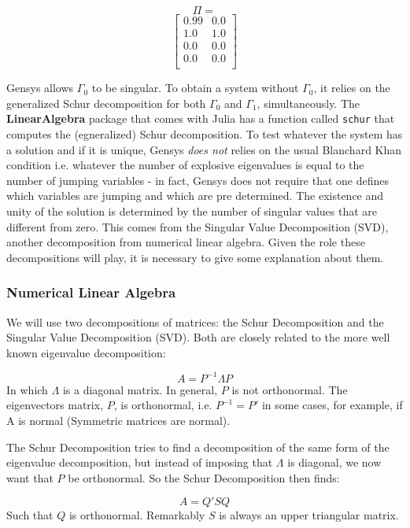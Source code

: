 \documentclass[12pt,a4paper]{article}
\begin{document}
$$\Pi = $$\begin{equation}
\left[
\begin{array}{cc}
0.99 & 0.0 \\
1.0 & 1.0 \\
0.0 & 0.0 \\
0.0 & 0.0 \\
\end{array}
\right]
\end{equation}


Gensys allows $\Gamma_0$ to be singular. To obtain a system without $\Gamma_0$, it relies on the generalized Schur decomposition for both $\Gamma_0$ and $\Gamma_1$, simultaneously. The \textbf{LinearAlgebra} package that comes with Julia has a function called \texttt{schur} that computes the (egneralized) Schur decomposition. To test whatever the system has a solution and if it is unique, Gensys \emph{does not} relies on the usual Blanchard Khan condition i.e. whatever the number of explosive eigenvalues is equal to the number of jumping variables - in fact, Gensys does not require that one defines which variables are jumping and which are pre determined. The existence and unity of the solution is determined by the number of singular values that are different from zero. This comes from the Singular Value Decomposition (SVD), another decomposition from numerical linear algebra. Given the role these decompositions will play, it is necessary to give some explanation about them.

\subsubsection{Numerical Linear Algebra}
We will use two decompositions of matrices: the Schur Decomposition and the Singular Value Decomposition (SVD). Both are closely related to the more well known eigenvalue decomposition:

\[
A = P^{-1}\Lambda P
\]
In which $\Lambda$ is a diagonal matrix. In general, $P$ is not orthonormal. The eigenvectors matrix, $P$, is orthonormal, i.e. $P^{-1} = P'$ in some cases, for example, if A is normal (Symmetric matrices are normal).

The Schur Decomposition tries to find a decomposition	of the same form of the eigenvalue decomposition, but instead of imposing that $\Lambda$ is diagonal, we now want that $P$ be orthonormal. So the Schur Decomposition then finds:

\[
A = Q'SQ
\]
Such that $Q$ is orthonormal. Remarkably $S$ is always an upper triangular matrix.
\end{document}
